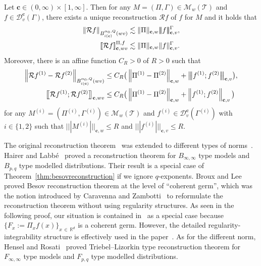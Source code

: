 \documentclass[AHL,Unicode,longabstracts,published]{cedram}
\newcommand{\bbR}{\mathbb{R}}
\newcommand{\bfc}{\mathbf{c}}
\newcommand{\mcD}{\mathcal{D}}
\newcommand{\mcR}{\mathcal{R}}
\newcommand{\scT}{\mathscr{T}}
\newcommand{\scM}{\mathscr{M}}
\newcommand{\tri}{|\!|\!|}
\newcommand{\llbracket}{\mathopen{[\mkern -2.7mu[}}
\newcommand{\rrbracket}{\mathclose{]\mkern -2.7mu]}}
\newcommand{\lb}{\llbracket}
\newcommand{\rb}{\rrbracket}
\newcommand{\bigtri}{\big|\mkern -2.7mu\big|\mkern -2.7mu\big|}
\newcommand{\llbigbracket}{\mathopen{\big[\mkern -4.2mu\big[}}
\newcommand{\rrbigbracket}{\mathclose{\big]\mkern -4.2mu\big]}}
\newcommand{\lbb}{\llbigbracket}
\newcommand{\rbb}{\rrbigbracket}
\begin{document}
\begin{theo}\label{thm:besovreconstruction}
Let $\bfc\in(0,\infty)\times[1,\infty]$. Then for any $M=(\Pi,\Gamma)\in\scM_{w}(\scT)$ and $f\in\mcD_{v}^\bfc(\Gamma)$, there exists a unique reconstruction $\mcR f$ of $f$ for $M$ and it holds that
\begin{align}\label{besovreconstruction}
\|\mcR f\|_{B_{i(\bfc)}^{\alpha_0,Q}(wv)}&\lesssim\|\Pi\|_{\bfc,w}\tri f\tri_{\bfc,v}^\Gamma,\\\label{besovreconstructioncharacterize}
\lb\mcR f\rb_{\bfc,wv}^{\Pi,f}&\lesssim \|\Pi\|_{\bfc,w}\|f\|_{\bfc,v}^\Gamma.
\end{align}
Moreover, there is an affine function $C_R>0$ of $R>0$ such that
\begin{align*}
\left\|\mcR f^{(1)}-\mcR f^{(2)}\right\|_{B_{i(\bfc)}^{\alpha_0,Q}(wv)}&\le C_R\big(\left\|\Pi^{(1)}-\Pi^{(2)}\right\|_{\bfc,w}+\bigtri f^{(1)};f^{(2)}\bigtri_{\bfc,v}\big),\\
\lbb\mcR f^{(1)};\mcR f^{(2)}\rbb_{\bfc,wv}&\le C_R\big(\left\|\Pi^{(1)}-\Pi^{(2)}\right\|_{\bfc,w}+\left\| f^{(1)};f^{(2)}\right\|_{\bfc,v}\big)
\end{align*}
for any $M^{(i)}=(\Pi^{(i)},\Gamma^{(i)})\in\scM_{w}(\scT)$ and $f^{(i)}\in\mcD_{v}^\bfc(\Gamma^{(i)})$ with $i\in\{1,2\}$ such that $\tri M^{(i)}\tri_{\bfc,w}\le R$ and $\tri f^{(i)}\tri_{\bfc,v}\le R$.
\end{theo}

\begin{rema}
The original reconstruction theorem~\cite[Theorem~3.10]{Hai14} was extended to different types of norms~\cite{BL22,HL17, HR20}. Hairer and Labbé~\cite{HL17} proved a reconstruction theorem for $B_{\infty,\infty}$ type models and $B_{p,q}$ type modelled distributions. Their result is a special case of Theorem~\ref{thm:besovreconstruction} if we ignore $q$-exponents. Broux and Lee~\cite{BL22} proved Besov reconstruction theorem at the level of ``coherent germ'', which was the notion introduced by Caravenna and Zambotti~\cite{CZ20} to reformulate the reconstruction theorem without using regularity structures. As seen in the following proof, our situation is contained in~\cite{BL22} as a special case because $\{F_x:=\Pi_xf(x)\}_{x\,\in\,\bbR^d}$ is a coherent germ. However, the detailed regularity-integrability structure is effectively used in the paper~\cite{BPHZ}. As for the different norm, Hensel and Rosati~\cite{HR20} proved Triebel--Lizorkin type reconstruction theorem for $F_{\infty,\infty}$ type models and $F_{p,q}$ type modelled distributions.
\end{rema}
\end{document}
